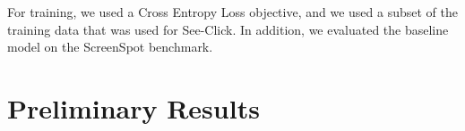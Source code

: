 \documentclass{article}
\begin{document}
For training, we used a Cross Entropy Loss objective, and we used a subset of the training data that was used for See-Click. In addition, we evaluated the baseline model on the ScreenSpot benchmark.
\section{Preliminary Results}














\end{document}
